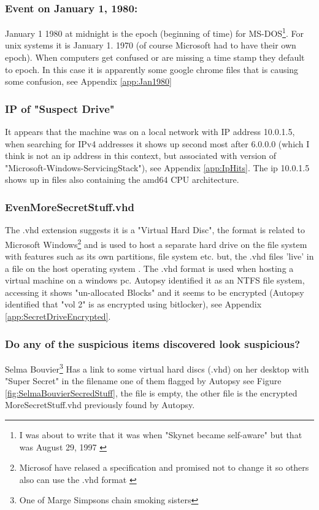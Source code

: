 \documentclass[
	letterpaper, %
	10pt, %
	unnumberedsections, %
	twoside, %
]{APAAssignment}
\begin{document}
\subsubsection{Event on January 1, 1980:}
January 1 1980 at midnight is the epoch (beginning of time) for MS-DOS\footnote{I was about to write that it was when "Skynet became self-aware" but that was August 29, 1997 \cite{enwiki:Terminator}}. For unix systems it is January 1. 1970 (of course Microsoft had to have their own epoch). When computers get confused or are missing a time stamp they default to epoch. In this case it is apparently some google chrome files that is causing some confusion, see Appendix \ref{app:Jan1980}

\subsubsection{IP of "Suspect Drive"}
It appears that the machine was on a local network with IP address 10.0.1.5, when searching for IPv4 addresses it shows up second most after 6.0.0.0 (which I think is not an ip address in this context, but associated with version of "Microsoft-Windows-ServicingStack"), see Appendix \ref{app:IpHits}. The ip 10.0.1.5 shows up in files also containing the amd64 CPU architecture.


\subsubsection{EvenMoreSecretStuff.vhd}
The .vhd extension suggests it is a "Virtual Hard Disc", the format is related to Microsoft Windows\footnote{Microsof have relased a specification and promised not to change it so others also can use the .vhd format \cite{VHD_Wiki}} and is used to host a separate hard drive on the file system with features such as its own partitions, file system etc. but, the .vhd files 'live' in a file on the host operating system \cite{VHD_Wiki}. The .vhd format is used when hosting a virtual machine on a windows pc. Autopsy identified it as an NTFS file system, accessing it shows "un-allocated Blocks" and it seems to be encrypted (Autopsy identified that "vol 2" is as encrypted using bitlocker), see Appendix \ref{app:SecretDriveEncrypted}.


\subsubsection{Do any of the suspicious items discovered look suspicious?}
Selma Bouvier\footnote{One of Marge Simpsons chain smoking sisters} Has a link to some virtual hard discs (.vhd) on her desktop with "Super Secret" in the filename one of them flagged by Autopsy see Figure \ref{fig:SelmaBouvierSecredStuff}, the file is empty, the other file is the encrypted MoreSecretStuff.vhd previously found by Autopsy.
\end{document}
